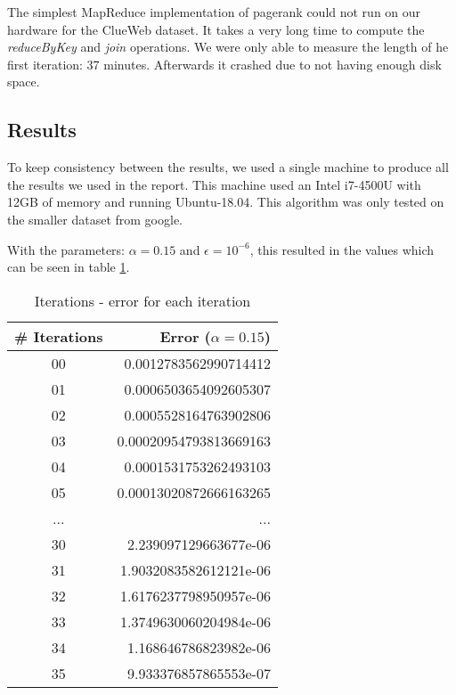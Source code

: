 \documentclass{article}
\begin{document}
The simplest MapReduce implementation of pagerank could not run on our hardware for the ClueWeb dataset. It takes a very long time to compute the \emph{reduceByKey} and \emph{join} operations. We were only able to measure the length of he first iteration: 37 minutes. Afterwards it crashed due to not having enough disk space. 

\subsection{Results}
To keep consistency between the results, we used a single machine to produce all the results we used in the report. This machine used an Intel i7-4500U with 12GB of memory and running Ubuntu-18.04. This algorithm was only tested on the smaller dataset from google.


With the parameters: $\alpha = 0.15$ and $\epsilon = 10^{-6}$, this resulted in the values which can be seen in table \ref{tab:google_it_errors}.

\begin{table}[H]
    \centering
    \begin{tabular}{ | c | r | }
    \hline
     \textbf{\# Iterations} & \textbf{Error ($\alpha = 0.15$)} \\ \hline
     00     & 0.0012783562990714412     \\ \hline
     01     & 0.0006503654092605307     \\ \hline
     02     & 0.0005528164763902806     \\ \hline                      
     03     & 0.00020954793813669163    \\ \hline                                   
     04     & 0.0001531753262493103     \\ \hline                                    
     05     & 0.00013020872666163265    \\ \hline                                 
     ...    & ...                       \\ \hline
     30     & 2.239097129663677e-06     \\ \hline
     31     & 1.9032083582612121e-06    \\ \hline
     32     & 1.6176237798950957e-06    \\ \hline
     33     & 1.3749630060204984e-06    \\ \hline
     34     & 1.168646786823982e-06     \\ \hline
     35     & 9.933376857865553e-07     \\ \hline
    \end{tabular}
    \caption{Iterations - error for each iteration}
    \label{tab:google_it_errors}
\end{table}
\end{document}
